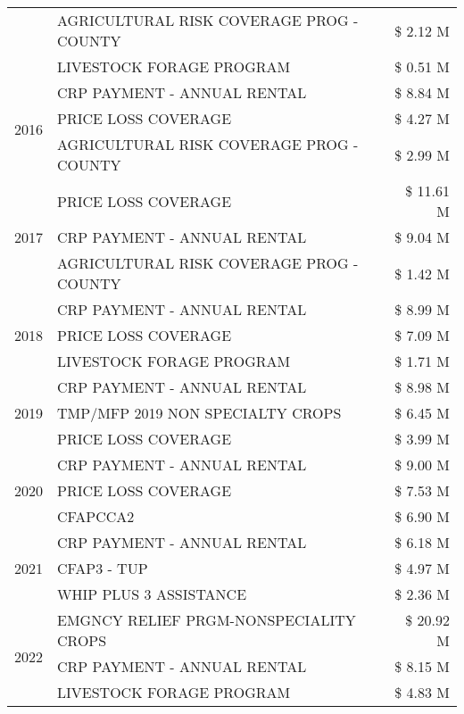 \begin{tabular}{llr}
 & AGRICULTURAL RISK COVERAGE PROG - COUNTY & \$ 2.12 M \\
 & LIVESTOCK FORAGE PROGRAM & \$ 0.51 M \\
\cline{1-3}
\multirow[t]{3}{*}{2016} & CRP PAYMENT - ANNUAL RENTAL & \$ 8.84 M \\
 & PRICE LOSS COVERAGE & \$ 4.27 M \\
 & AGRICULTURAL RISK COVERAGE PROG - COUNTY & \$ 2.99 M \\
\cline{1-3}
\multirow[t]{3}{*}{2017} & PRICE LOSS COVERAGE & \$ 11.61 M \\
 & CRP PAYMENT - ANNUAL RENTAL & \$ 9.04 M \\
 & AGRICULTURAL RISK COVERAGE PROG - COUNTY & \$ 1.42 M \\
\cline{1-3}
\multirow[t]{3}{*}{2018} & CRP PAYMENT - ANNUAL RENTAL & \$ 8.99 M \\
 & PRICE LOSS COVERAGE & \$ 7.09 M \\
 & LIVESTOCK FORAGE PROGRAM & \$ 1.71 M \\
\cline{1-3}
\multirow[t]{3}{*}{2019} & CRP PAYMENT - ANNUAL RENTAL & \$ 8.98 M \\
 & TMP/MFP 2019 NON SPECIALTY CROPS & \$ 6.45 M \\
 & PRICE LOSS COVERAGE & \$ 3.99 M \\
\cline{1-3}
\multirow[t]{3}{*}{2020} & CRP PAYMENT - ANNUAL RENTAL & \$ 9.00 M \\
 & PRICE LOSS COVERAGE & \$ 7.53 M \\
 & CFAPCCA2 & \$ 6.90 M \\
\cline{1-3}
\multirow[t]{3}{*}{2021} & CRP PAYMENT - ANNUAL RENTAL & \$ 6.18 M \\
 & CFAP3 - TUP & \$ 4.97 M \\
 & WHIP PLUS 3 ASSISTANCE & \$ 2.36 M \\
\cline{1-3}
\multirow[t]{3}{*}{2022} & EMGNCY RELIEF PRGM-NONSPECIALITY CROPS & \$ 20.92 M \\
 & CRP PAYMENT - ANNUAL RENTAL & \$ 8.15 M \\
 & LIVESTOCK FORAGE PROGRAM & \$ 4.83 M \\
\cline{1-3}
\bottomrule
\end{tabular}
